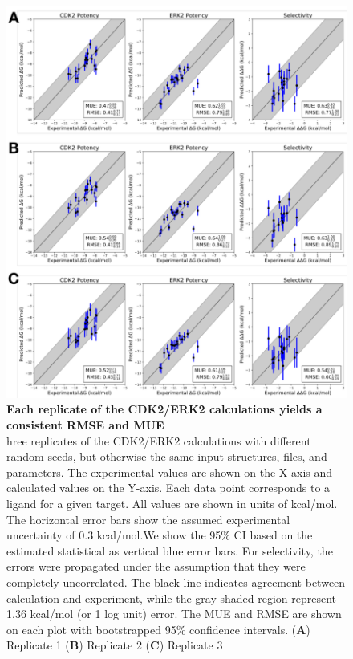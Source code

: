\documentclass[9pt,lineno]{elife-modified} %
\begin{document}
\begin{figure}[h]
	\begin{fullwidth}
		\begin{centering}
			\includegraphics[width=1.0\linewidth]{figures/supp_figure6.pdf}
		\end{centering}
		\caption{
			\label{fig:sup-figure-6}
	{\bf Each replicate of the CDK2/ERK2 calculations yields a consistent RMSE and MUE} \\
	hree replicates of the CDK2/ERK2 calculations with different random seeds, but otherwise the same input structures, files, and parameters. The experimental values are shown on the X-axis and calculated values on the Y-axis. Each data point corresponds to a ligand for a given target. All values are shown in units of kcal/mol. The horizontal error bars show the assumed experimental uncertainty of 0.3 kcal/mol\citep{BROWN2009420}.We show the 95\% CI based on the estimated statistical as vertical blue error bars. For selectivity, the errors were propagated under the assumption that they were completely uncorrelated.  The black line indicates agreement between calculation and experiment, while the gray shaded region represent 1.36 kcal/mol (or 1 log unit) error. The MUE and RMSE are shown on each plot with bootstrapped 95$\%$ confidence intervals. ({\bf A}) Replicate 1 ({\bf B}) Replicate 2 ({\bf C}) Replicate 3}
	\end{fullwidth}
\end{figure}
\end{document}
